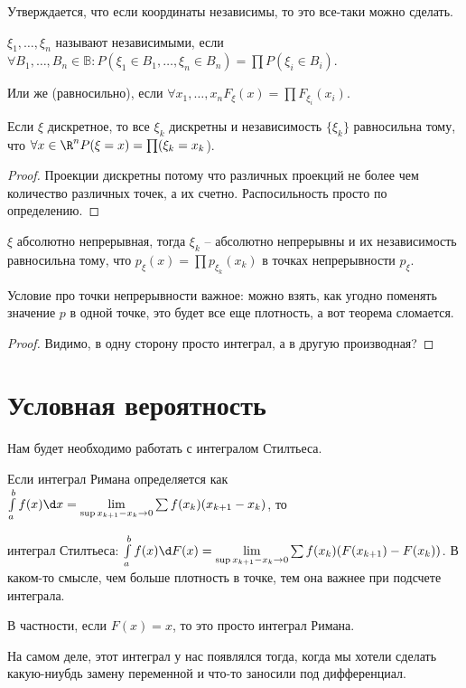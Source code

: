 Утверждается, что если координаты независимы, то это все-таки можно сделать.
\begin{Def}
$\xi_1, \dots, \xi_n$ называют независимыми, если $\forall B_1, \dots, B_n \in \mathbb{B}\colon P(\xi_1 \in B_1, \dots, \xi_n \in B_n) = \prod P(\xi_i \in B_i)$.

Или же (равносильно), если $\forall x_1, \dots, x_n F_{\xi}(x) = \prod F_{\xi_i}(x_i)$.
\end{Def}
\begin{theorem}
Если $\xi$ дискретное, то все $\xi_k$ дискретны и независимость $\{\xi_k\}$ равносильна тому, что $\forall x \in \R^n P(\xi=x) = \prod (\xi_k = x_k$).
\end{theorem}
\begin{proof}
Проекции дискретны потому что различных проекций не более чем количество различных точек, а их счетно. 
Распосильность просто по определению.
\end{proof}
\begin{theorem}
$\xi$ абсолютно непрерывная, тогда $\xi_k$ -- абсолютно непрерывны и их независимость равносильна тому, что $p_{\xi}(x) = \prod p_{\xi_k}(x_k)$ в точках непрерывности $p_{\xi}$.
\end{theorem}
\begin{Rem}
Условие про точки непрерывности важное: можно взять, как угодно поменять значение $p$ в одной точке, это будет все еще плотность, а вот теорема сломается.
\end{Rem}
\begin{proof}
Видимо, в одну сторону просто интеграл, а в другую производная? \TODO
\end{proof}

\section{Условная вероятность}
Нам будет необходимо работать с интегралом Стилтьеса. 

Если интеграл Римана определяется как $\int\limits_a^b f(x)\d x = \lim\limits_{\sup x_{k+1}-x_k \to 0} \sum f(x_k)(x_{k+1} - x_k)$, то

интеграл Стилтьеса: $\int\limits_a^b f(x)\d F(x) = \lim \limits_{\sup x_{k+1}-x_k \to 0} \sum f(x_k) (F(x_{k+1}) - F(x_k))$. В каком-то смысле, чем больше плотность в точке, тем она важнее при подсчете интеграла.

В частности, если $F(x) = x$, то это просто интеграл Римана.
\begin{Rem}
На самом деле, этот интеграл у нас появлялся тогда, когда мы хотели сделать какую-ниубдь замену переменной и что-то заносили под дифференциал.
\end{Rem}


